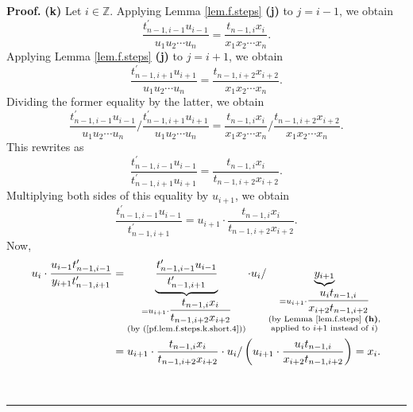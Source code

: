 \documentclass[numbers=enddot,12pt,final,onecolumn,notitlepage]{scrartcl}%
\theoremstyle{definition}
\newenvironment{proof}[1][Proof]{\noindent\textbf{#1.} }{\ \rule{0.5em}{0.5em}}
\newenvironment{vershort}{}{}
\begin{document}
\begin{proof}
\begin{vershort}
\textbf{(k)} Let $i\in\mathbb{Z}$. Applying Lemma \ref{lem.f.steps}
\textbf{(j)} to $j=i-1$, we obtain%
\[
\dfrac{t_{n-1,i-1}^{\prime}u_{i-1}}{u_{1}u_{2}\cdots u_{n}}=\dfrac
{t_{n-1,i}x_{i}}{x_{1}x_{2}\cdots x_{n}}.
\]
Applying Lemma \ref{lem.f.steps} \textbf{(j)} to $j=i+1$, we obtain%
\[
\dfrac{t_{n-1,i+1}^{\prime}u_{i+1}}{u_{1}u_{2}\cdots u_{n}}=\dfrac
{t_{n-1,i+2}x_{i+2}}{x_{1}x_{2}\cdots x_{n}}.
\]
Dividing the former equality by the latter, we obtain%
\[
\dfrac{t_{n-1,i-1}^{\prime}u_{i-1}}{u_{1}u_{2}\cdots u_{n}}/\dfrac
{t_{n-1,i+1}^{\prime}u_{i+1}}{u_{1}u_{2}\cdots u_{n}}=\dfrac{t_{n-1,i}x_{i}%
}{x_{1}x_{2}\cdots x_{n}}/\dfrac{t_{n-1,i+2}x_{i+2}}{x_{1}x_{2}\cdots x_{n}}.
\]
This rewrites as%
\[
\dfrac{t_{n-1,i-1}^{\prime}u_{i-1}}{t_{n-1,i+1}^{\prime}u_{i+1}}%
=\dfrac{t_{n-1,i}x_{i}}{t_{n-1,i+2}x_{i+2}}.
\]
Multiplying both sides of this equality by $u_{i+1}$, we obtain%
\begin{equation}
\dfrac{t_{n-1,i-1}^{\prime}u_{i-1}}{t_{n-1,i+1}^{\prime}}=u_{i+1}\cdot
\dfrac{t_{n-1,i}x_{i}}{t_{n-1,i+2}x_{i+2}}. \label{pf.lem.f.steps.k.short.4}%
\end{equation}
Now,%
\begin{align*}
u_{i}\cdot\dfrac{u_{i-1}t_{n-1,i-1}^{\prime}}{y_{i+1}t_{n-1,i+1}^{\prime}}  &
=\underbrace{\dfrac{t_{n-1,i-1}^{\prime}u_{i-1}}{t_{n-1,i+1}^{\prime}}%
}_{\substack{=u_{i+1}\cdot\dfrac{t_{n-1,i}x_{i}}{t_{n-1,i+2}x_{i+2}%
}\\\text{(by (\ref{pf.lem.f.steps.k.short.4}))}}}\cdot u_{i}%
/\underbrace{y_{i+1}}_{\substack{=u_{i+1}\cdot\dfrac{u_{i}t_{n-1,i}}%
{x_{i+2}t_{n-1,i+2}}\\\text{(by Lemma \ref{lem.f.steps} \textbf{(h)}%
,}\\\text{applied to }i+1\text{ instead of }i\text{)}}}\\
&  =u_{i+1}\cdot\dfrac{t_{n-1,i}x_{i}}{t_{n-1,i+2}x_{i+2}}\cdot u_{i}/\left(
u_{i+1}\cdot\dfrac{u_{i}t_{n-1,i}}{x_{i+2}t_{n-1,i+2}}\right)  =x_{i}.
\end{align*}

\end{vershort}


\end{proof}
\end{document}
